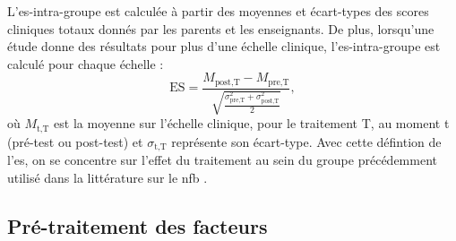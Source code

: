 L'\gls{es}-intra-groupe est calculée à partir des moyennes et écart-types des scores cliniques totaux donnés par les parents et les enseignants. De plus, lorsqu'une étude 
donne des résultats pour plus d'une échelle clinique, l'\gls{es}-intra-groupe est calculé pour chaque échelle :
\begin{equation*}
\label{eq:factors_effect_size_within_subject}
\text{ES} = \frac{M_{\text{post,T}} - M_{\text{pre,T}}}{\sqrt{\frac{\sigma_{\text{pre,T}}^2 + \sigma_{\text{post,T}}^2}{2}}},
\end{equation*} 
\noindent où $M_{\text{t,T}}$ est la moyenne sur l'échelle clinique, pour le traitement T, au moment t (pré-test ou post-test) et $\sigma_{\text{t,T}}$ représente
son écart-type. Avec cette défintion de l'\gls{es}, on se concentre sur l'effet du traitement au sein du groupe \citep{Cohen1988} précédemment utilisé dans la littérature sur le \gls{nfb} 
\citep{Arns2009, Maurizio2014, Strehl2017}.  
%

\subsection{Pré-traitement des facteurs}
